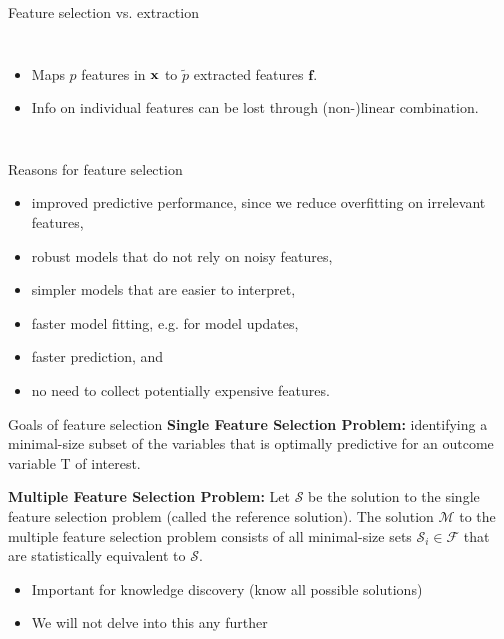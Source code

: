 \documentclass[11pt,compress,t,notes=noshow, xcolor=table]{beamer}
\begin{document}
\begin{vbframe}{Feature selection vs. extraction}
\begin{columns}
    \smallskip

    \begin{itemize}
    \item Maps $p$ features in $\mathbf{x}$ to $\tilde{p}$ extracted features $\bm{f}$.
    \item Info on individual features can be lost through (non-)linear combination.
    \end{itemize}

\end{columns}

\end{vbframe}

\begin{frame}{Reasons for feature selection}
\begin{itemize}
    \item improved predictive performance, since we reduce overfitting on irrelevant features,
    \item robust models that do not rely on noisy features,
    \item simpler models that are easier to interpret,
    \item faster model fitting, e.g. for model updates,
    \item faster prediction, and
    \item no need to collect potentially expensive features.
\end{itemize}
\end{frame}

\begin{frame}{Goals of feature selection}
\vfill
\textbf{Single Feature Selection Problem:} identifying a minimal-size subset of the variables that is optimally predictive for an outcome variable T of interest.

\vfill

\textbf{Multiple Feature Selection Problem:} Let $\mathcal{S}$ be the solution to the single feature selection problem (called the reference solution). The solution $\mathcal{M}$ to the multiple feature selection problem consists of all minimal-size sets $\mathcal{S}_i \in \mathcal{F}$  that are statistically equivalent to $\mathcal{S}$.
\begin{itemize}
    \item Important for knowledge discovery (know all possible solutions)
    \item We will not delve into this any further
\end{itemize}
\vfill
\end{frame}
\end{document}

